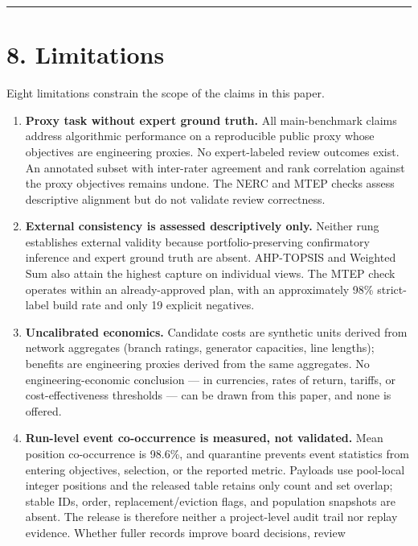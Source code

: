 \documentclass[
  10pt,
  a4paper,
]{article}
\begin{document}
\begin{center}\rule{0.5\linewidth}{0.5pt}\end{center}

\section{8. Limitations}\label{limitations}

Eight limitations constrain the scope of the claims in this paper.

\begin{enumerate}
\def\labelenumi{\arabic{enumi}.}
\item
  \textbf{Proxy task without expert ground truth.} All main-benchmark
  claims address algorithmic performance on a reproducible public proxy
  whose objectives are engineering proxies. No expert-labeled review
  outcomes exist. An annotated subset with inter-rater agreement and
  rank correlation against the proxy objectives remains undone. The NERC
  and MTEP checks assess descriptive alignment but do not validate
  review correctness.
\item
  \textbf{External consistency is assessed descriptively only.} Neither
  rung establishes external validity because portfolio-preserving
  confirmatory inference and expert ground truth are absent. AHP-TOPSIS
  and Weighted Sum also attain the highest capture on individual views.
  The MTEP check operates within an already-approved plan, with an
  approximately 98\% strict-label build rate and only 19 explicit
  negatives.
\item
  \textbf{Uncalibrated economics.} Candidate costs are synthetic units
  derived from network aggregates (branch ratings, generator capacities,
  line lengths); benefits are engineering proxies derived from the same
  aggregates. No engineering-economic conclusion --- in currencies,
  rates of return, tariffs, or cost-effectiveness thresholds --- can be
  drawn from this paper, and none is offered.
\item
  \textbf{Run-level event co-occurrence is measured, not validated.}
  Mean position co-occurrence is 98.6\%, and quarantine prevents event
  statistics from entering objectives, selection, or the reported
  metric. Payloads use pool-local integer positions and the released
  table retains only count and set overlap; stable IDs, order,
  replacement/eviction flags, and population snapshots are absent. The
  release is therefore neither a project-level audit trail nor replay
  evidence. Whether fuller records improve board decisions, review

\end{enumerate}
\end{document}

